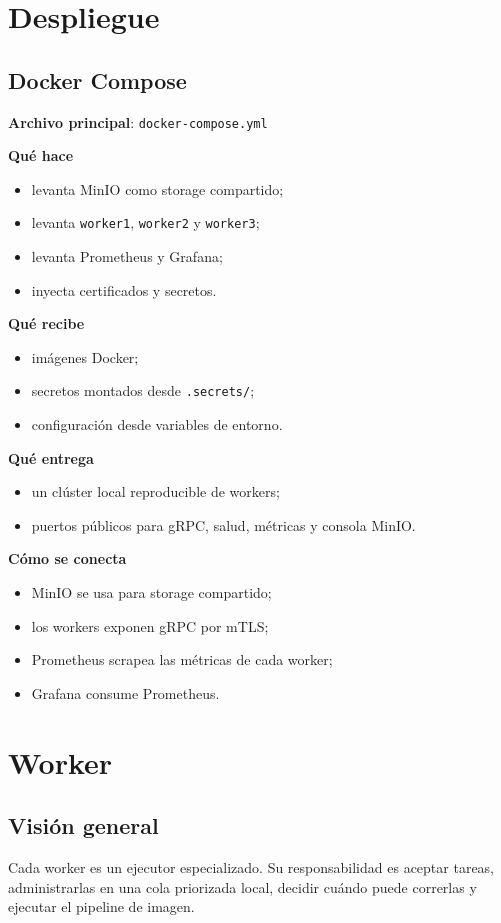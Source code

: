 \documentclass[11pt]{article}
\begin{document}
\section{Despliegue}

\subsection{Docker Compose}
\textbf{Archivo principal}: \texttt{docker-compose.yml}

\textbf{Qué hace}
\begin{itemize}
\item levanta MinIO como storage compartido;
\item levanta \texttt{worker1}, \texttt{worker2} y \texttt{worker3};
\item levanta Prometheus y Grafana;
\item inyecta certificados y secretos.
\end{itemize}

\textbf{Qué recibe}
\begin{itemize}
\item imágenes Docker;
\item secretos montados desde \texttt{.secrets/};
\item configuración desde variables de entorno.
\end{itemize}

\textbf{Qué entrega}
\begin{itemize}
\item un clúster local reproducible de workers;
\item puertos públicos para gRPC, salud, métricas y consola MinIO.
\end{itemize}

\textbf{Cómo se conecta}
\begin{itemize}
\item MinIO se usa para storage compartido;
\item los workers exponen gRPC por mTLS;
\item Prometheus scrapea las métricas de cada worker;
\item Grafana consume Prometheus.
\end{itemize}

\section{Worker}

\subsection{Visión general}
Cada worker es un ejecutor especializado. Su responsabilidad es aceptar tareas, administrarlas en una cola priorizada local, decidir cuándo puede correrlas y ejecutar el pipeline de imagen.
\end{document}
